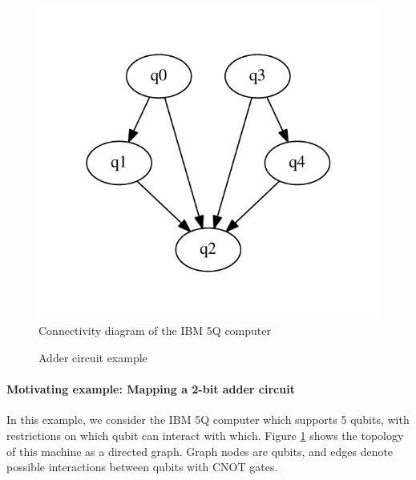 \documentclass[11pt,a4paper]{article}
\begin{document}
\begin{figure}[htb]
\centering
\includegraphics[scale=.5]{fig/ibm5q}
\caption{Connectivity diagram of the IBM 5Q computer}
\label{fig:topology}
\end{figure}

\begin{figure}[htb]
\caption{Adder circuit example}
\label{fig:adder}
\end{figure}

\paragraph{Motivating example: Mapping a 2-bit adder circuit}
In this example, we consider the IBM 5Q computer which supports 5 qubits, with restrictions on which qubit can interact with which.
Figure \ref{fig:topology} shows the topology of this machine as a directed graph. Graph nodes are qubits, and edges denote possible interactions between qubits with CNOT gates.
\end{document}
